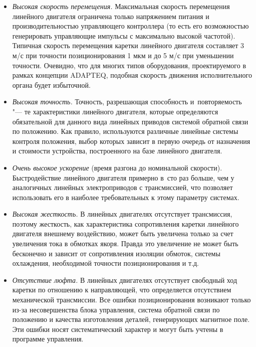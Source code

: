 \begin{itemize}
	\item \textit{Высокая скорость перемещения.} Максимальная скорость перемещения линейного двигателя ограничена только напряжением питания и производительностью управляющего контроллера (то есть его возможностью генерировать управляющие импульсы с максимально высокой частотой). Типичная скорость перемещения каретки линейного двигателя составляет 3 м/с при точности позиционирования 1 мкм и до 5 м/с при уменьшении точности. Очевидно, что для многих типов оборудования, проектируемого в рамках концепции ADAPTEQ, подобная скорость движения исполнительного органа будет избыточной.
	
	\item \textit{Высокая точность.} Точность, разрешающая способность и~повторяемость "--- те характеристики линейного двигателя, которые определяются обязательной для данного вида линейных приводов системой обратной связи по положению. Как правило, используются различные линейные системы контроля положения, выбор которых зависит в первую очередь от назначения и стоимости устройства, построенного на базе линейного двигателя.
	
	\item \textit{Очень высокое ускорение} (время разгона до номинальной скорости). Быстродействие линейного двигателя примерно в~сто раз больше, чем у аналогичных линейных электроприводов с трансмиссией, что позволяет использовать его в наиболее требовательных к этому параметру системах.
	
	\item \textit{Высокая жесткость.} В линейных двигателях отсутствует трансмиссия, поэтому жесткость, как характеристика сопротивления каретки линейного двигателя внешнему воздействию, может быть увеличена только за счет увеличения тока в обмотках якоря. Правда это увеличение не может быть бесконечно и зависит от сопротивления изоляции обмоток, системы охлаждения, необходимой точности позиционирования и т.\:д.
	
	\item \textit{Отсутствие люфта.} В линейных двигателях отсутствует свободный ход каретки по отношению к направляющей, что определяется отсутствием механической трансмиссии. Все ошибки позиционирования возникают только из-за несовершенства блока управления, система обратной связи по положению и качества изготовления деталей, генерирующих магнитное поле. Эти ошибки носят систематический характер и могут быть учтены в программе управления. 
\end{itemize}

